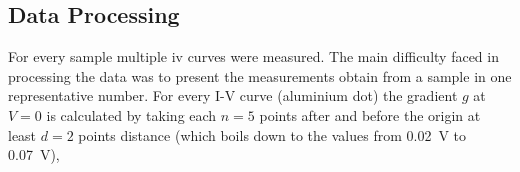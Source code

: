 \subsection{Data Processing}
\label{sec:eval}
For every sample multiple \gls{iv} curves were measured. 
The main difficulty faced in processing the data was to present the measurements obtain 
from a sample in one representative number. 
%
%
For every I-V curve (aluminium dot) the gradient $g$ at $V=0$ is calculated by taking 
each $n=5$ points after and before the origin at least $d=2$ points distance (which boils
down to the values from \SI{0.02}{\volt} to \SI{0.07}{\volt}), 
